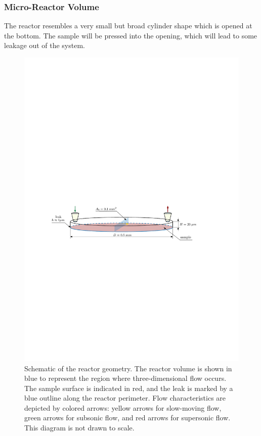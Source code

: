 \subsubsection*{Micro-Reactor Volume}
	The reactor resembles a very small but broad cylinder shape which is opened at the bottom.
	The sample will be pressed into the opening, which will lead to some leakage out of the system.
	\begin{figure}[H]
	    \centering
	    \includegraphics[width=\textwidth]{src/03_analytical-work/fig_reactor-geometry.pdf}
	    \caption{
			Schematic of the reactor geometry.
			The reactor volume is shown in blue to represent the region where three-dimensional flow occurs.
			The sample surface is indicated in red, and the leak is marked by a blue outline along the reactor perimeter.
			Flow characteristics are depicted by colored arrows: yellow arrows for slow-moving flow, green arrows for subsonic flow, and red arrows for supersonic flow.
			This diagram is not drawn to scale.
		}
	    \label{fig:geometry-reactor}
	\end{figure}


